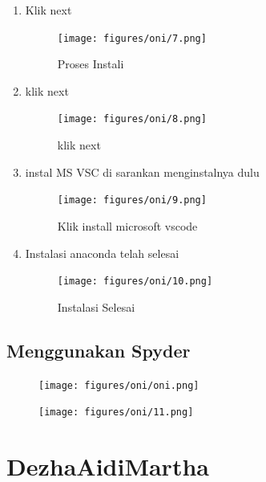 \begin{enumerate}
    \item Klik next
    \begin{figure}[H]
        \centering
        \texttt{[image: figures/oni/7.png]}
        \caption{Proses Instali}
        \label{Proses}
        \end{figure}

    \item klik next
    \begin{figure}[H]
        \centering
        \texttt{[image: figures/oni/8.png]}
        \caption{klik next}
        \label{offering}
        \end{figure}

 \item instal MS VSC di sarankan menginstalnya dulu
    \begin{figure}[H]
        \centering
        \texttt{[image: figures/oni/9.png]}
        \caption{Klik install microsoft vscode}
        \label{offering}
        \end{figure}

    \item Instalasi anaconda telah selesai
     \begin{figure}[H]
        \centering
        \texttt{[image: figures/oni/10.png]}
        \caption{Instalasi Selesai}
        \label{akhir}
        \end{figure}
\end{enumerate}

\subsection{Menggunakan Spyder}

 \begin{figure}[H]
        \centering
        \texttt{[image: figures/oni/oni.png]}
        \label{akhir}
        \end{figure}

     \begin{figure}[H]
        \centering
        \texttt{[image: figures/oni/11.png]}
        \label{akhir}
        \end{figure}



\section{DezhaAidiMartha}

